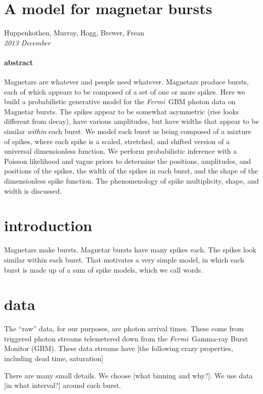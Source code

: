 \documentclass[12pt]{article}
\newcommand{\project}[1]{\textsl{#1}}
\newcommand{\Fermi}{\project{Fermi}}
\begin{document}
\section*{A model for magnetar bursts}

\noindent
Huppenkothen, Murray, Hogg, Brewer, Frean \\
\textsl{2013 December}

\paragraph{abstract}
Magnetars are whatever and people need whatever.
Magnetars produce bursts,
  each of which appears to be composed of a set of one or more spikes.
Here we build a probabilistic generative model for the \Fermi\ GBM photon data on Magnetar bursts.
The spikes appear to be somewhat asymmetric
  (rise looks different from decay),
  have various amplitudes,
  but have widths that appear to be similar \emph{within} each burst.
We model each burst as being composed of a mixture of spikes,
  where each spike is a scaled, stretched, and shifted version of a universal dimensionless function.
We perform probabilistic inference with a Poisson likelihood and vague priors to determine
  the positions, amplitudes, and positions of the spikes,
  the width of the spikes in each burst,
  and the shape of the dimensionless spike function.
The phenomenology of spike multiplicity, shape, and width is discussed.

\section{introduction}

Magnetars make bursts.
Magnetar bursts have many spikes each.
The spikes look similar within each burst.
That motivates a very simple model,
  in which each burst is made up of a sum of spike models, which we call words.

\section{data}

The ``raw'' data, for our purposes, are photon arrival times.
These come from triggered photon streams telemetered down from the \Fermi\ Gamma-ray Burst Monitor (GBM).
These data streams have [the following crazy properties, including dead time, saturation]

There are many small details.
We choose [what binning and why?].
We use data [in what interval?] around each burst.
\end{document}
